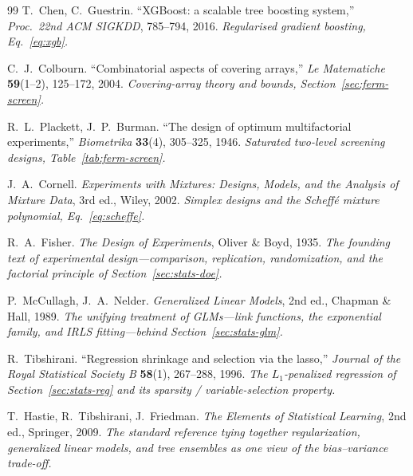 \begin{thebibliography}{99}
T.~Chen, C.~Guestrin.
``XGBoost: a scalable tree boosting system,'' \textit{Proc.\ 22nd ACM SIGKDD},
785--794, 2016.
\emph{Regularised gradient boosting, Eq.~\eqref{eq:xgb}.}

C.~J.~Colbourn.
``Combinatorial aspects of covering arrays,'' \textit{Le Matematiche}
\textbf{59}(1--2), 125--172, 2004.
\emph{Covering-array theory and bounds, Section~\ref{sec:ferm-screen}.}

R.~L.~Plackett, J.~P.~Burman.
``The design of optimum multifactorial experiments,'' \textit{Biometrika}
\textbf{33}(4), 305--325, 1946.
\emph{Saturated two-level screening designs, Table~\ref{tab:ferm-screen}.}

J.~A.~Cornell.
\textit{Experiments with Mixtures: Designs, Models, and the Analysis of Mixture
Data}, 3rd ed., Wiley, 2002.
\emph{Simplex designs and the Scheff\'e mixture polynomial, Eq.~\eqref{eq:scheffe}.}

R.~A.~Fisher.
\textit{The Design of Experiments}, Oliver \& Boyd, 1935.
\emph{The founding text of experimental design---comparison, replication,
randomization, and the factorial principle of Section~\ref{sec:stats-doe}.}

P.~McCullagh, J.~A.~Nelder.
\textit{Generalized Linear Models}, 2nd ed., Chapman \& Hall, 1989.
\emph{The unifying treatment of GLMs---link functions, the exponential family,
and IRLS fitting---behind Section~\ref{sec:stats-glm}.}

R.~Tibshirani.
``Regression shrinkage and selection via the lasso,'' \textit{Journal of the
Royal Statistical Society B} \textbf{58}(1), 267--288, 1996.
\emph{The $L_1$-penalized regression of Section~\ref{sec:stats-reg} and its
sparsity / variable-selection property.}

T.~Hastie, R.~Tibshirani, J.~Friedman.
\textit{The Elements of Statistical Learning}, 2nd ed., Springer, 2009.
\emph{The standard reference tying together regularization, generalized linear
models, and tree ensembles as one view of the bias--variance trade-off.}

\end{thebibliography}
